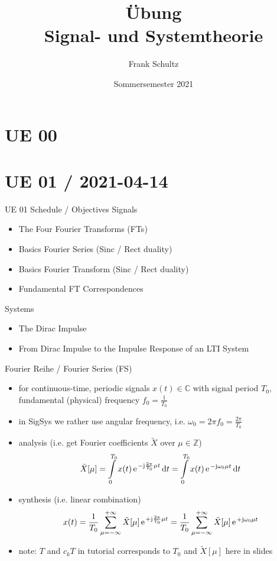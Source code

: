 \documentclass[mathserif, aspectratio=43]{intbeamer}
\title[UE SigSys]{Übung \\ \huge Signal- und Systemtheorie}
\author[Schultz, INT, IEF, Uni Rostock]{Frank Schultz}
\date[SS 2021]{Sommersemester 2021}
\begin{document}
\maketitle
\section{UE 00}




\section{UE 01 / 2021-04-14}
%
\begin{frame}{UE 01 Schedule / Objectives}
Signals
\begin{itemize}
\item The Four Fourier Transforms (FTs)
\item Basics Fourier Series (Sinc / Rect duality)
\item Basics Fourier Transform (Sinc / Rect duality)
\item Fundamental FT Correspondences
\end{itemize}
Systems
\begin{itemize}
\item The Dirac Impulse
\item From Dirac Impulse to the Impulse Response of an LTI System
\end{itemize}
\end{frame}




\begin{frame}{Fourier Reihe / Fourier Series (FS)}
\begin{itemize}
\item for continuous-time, periodic signals $x(t)\in\mathbb{C}$
with signal period $T_0$, fundamental (physical) frequency $f_0=\frac{1}{T_0}$
\item in SigSys we rather use angular frequency, i.e. $\omega_0 = 2 \pi f_0 = \frac{2\pi}{T_0}$
\item analysis (i.e. get Fourier coefficients $\tilde{X}$ over $\mu\in\mathbb{Z}$)
$$\tilde{X}[\mu] =
\int\limits_{0}^{T_0} x(t) \, \e^{-\im \frac{2\pi}{T_0} \mu t}\,\mathrm{d}t =
\int\limits_{0}^{T_0} x(t) \, \e^{-\im \omega_0 \mu t}\,\mathrm{d}t$$
\item synthesis (i.e. linear combination)
$$x(t) =
\frac{1}{T_0}\sum\limits_{\mu=-\infty}^{+\infty} \tilde{X}[\mu] \,\e^{+\im \frac{2\pi}{T_0} \mu t} =
\frac{1}{T_0}\sum\limits_{\mu=-\infty}^{+\infty} \tilde{X}[\mu] \,\e^{+\im \omega_0 \mu t}
$$
\item note: $T$ and $c_k T$ in tutorial corresponds to $T_0$ and $\tilde{X}[\mu]$ here in slides
\end{itemize}
\end{frame}
\end{document}
